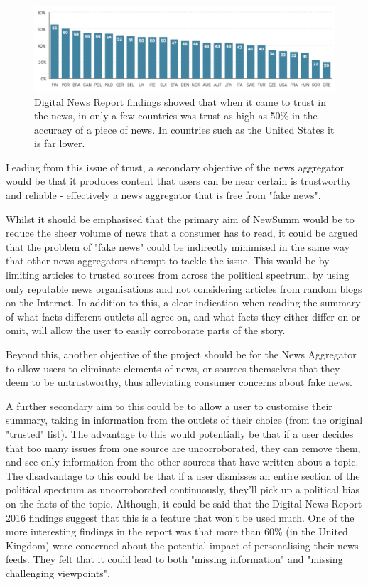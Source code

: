 \documentclass[12pt]{article}
\begin{document}
\begin{figure}[h]
  \centering
    \includegraphics[width=\textwidth]{TrustInNews.png}
   \caption[The Digital News Report 2016 on trust in the news]{Digital News Report findings showed that when it came to trust in the news, in only a few countries was trust as high as 50\% in the accuracy of a piece of news. In countries such as the United States it is far lower.}
   \label{TrustInNews}
\end{figure}

Leading from this issue of trust, a secondary objective of the news aggregator would be that it produces content that users can be near certain is trustworthy and reliable - effectively a news aggregator that is free from "fake news".

Whilst it should be emphasised that the primary aim of NewSumm would be to reduce the sheer volume of news that a consumer has to read, it could be argued that the problem of "fake news" could be indirectly minimised in the same way that other news aggregators attempt to tackle the issue. This would be by limiting articles to trusted sources from across the political spectrum, by using only reputable news organisations and not considering articles from random blogs on the Internet. In addition to this, a clear indication when reading the summary of what facts different outlets all agree on, and what facts they either differ on or omit, will allow the user to easily corroborate parts of the story.

Beyond this, another objective of the project should be for the News Aggregator to allow users to eliminate elements of news, or sources themselves that they deem to be untrustworthy, thus alleviating consumer concerns about fake news.

A further secondary aim to this could be to allow a user to customise their summary, taking in information from the outlets of their choice (from the original "trusted" list). The advantage to this would potentially be that if a user decides that too many issues from one source are uncorroborated, they can remove them, and see only information from the other sources that have written about a topic. The disadvantage to this could be that if a user dismisses an entire section of the political spectrum as uncorroborated continuously, they'll pick up a political bias on the facts of the topic. Although, it could be said that the Digital News Report 2016 findings suggest that this is a feature that won't be used much. One of the more interesting findings in the report was that more than 60\% (in the United Kingdom) were concerned about the potential impact of personalising their news feeds. They felt that it could lead to both "missing information" and "missing challenging viewpoints".   
\end{document}
